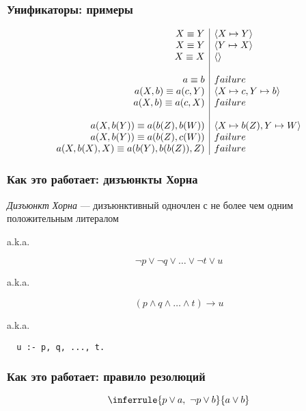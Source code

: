 \documentclass{beamer}
\begin{document}
\begin{frame}[fragile]
  \frametitle{Унификаторы: примеры}
\[
  \begin{array}{r | l}
    X \equiv Y & \langle X \mapsto Y \rangle \\
    X \equiv Y & \langle Y \mapsto X \rangle \\
    X \equiv X & \langle \rangle \\
    & \\
    a \equiv b & failure \\
    a(X, b) \equiv a(c, Y) & \langle X \mapsto c, Y \mapsto b \rangle \\
    a(X, b) \equiv a(c, X) & failure \\
    & \\
    a(X, b(Y)) \equiv a(b(Z), b(W)) & \langle X \mapsto b(Z), Y \mapsto W \rangle \\
    a(X, b(Y)) \equiv a(b(Z), c(W)) & failure \\
    a(X, b(X), X) \equiv a(b(Y), b(b(Z)), Z) & failure
  \end{array}
\]

\end{frame}

\begin{frame}[fragile]
  \frametitle{Как это работает: дизъюнкты Хорна}
\textit{Дизъюнкт Хорна} --- дизъюнктивный одночлен с не более чем одним положительным литералом
\begin{center}
  a.k.a.
\end{center}
\[
  \neg p \vee \neg q \vee \dots \vee \neg t \vee u
\]
\begin{center}
  a.k.a.
\end{center}
\[
  (p \wedge q \wedge \dots \wedge t) \to u
\]
\begin{center}
  a.k.a.
\end{center}
\begin{center}
  \begin{minipage}{0.35\textwidth}
    \begin{verbatim}
  u :- p, q, ..., t.
    \end{verbatim}
  \end{minipage}
\end{center}

\end{frame}

\begin{frame}[fragile]
  \frametitle{Как это работает: правило резолюций}
\[\inferrule{p \vee a, \ \neg p \vee b}{a \vee b}\]
\end{frame}
\end{document}
